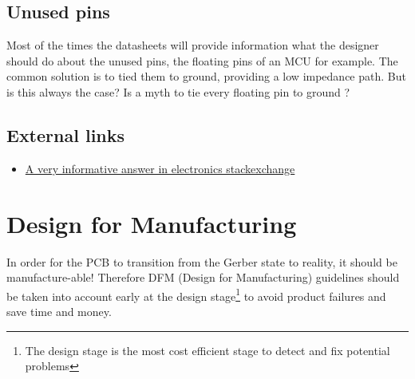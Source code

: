 \documentclass[final]{cubedoc}
\begin{document}
	\subsection{Unused pins}
	
	Most of the times the datasheets will provide information what the designer should do about the unused pins, the floating pins of an MCU for example. The common solution is to tied them to ground, providing a low impedance path. But is this always the case? Is a myth to tie every floating pin to ground \cite{learnemc:myth, rangu2014getting}?
	
	
	
	
	\subsection{External links}
	
	\begin{itemize}
		\item \href{https://web.archive.org/web/20200815071606/https://electronics.stackexchange.com/questions/15135/decoupling-caps-pcb-layout/15143}{A very informative answer in electronics stackexchange}
	\end{itemize}
	
	\section{Design for Manufacturing}
	
	In order for the PCB to transition from the Gerber state to reality, it should be manufacture-able! Therefore DFM (Design for Manufacturing) guidelines should be taken into account early at the design stage\footnote{The design stage is the most cost efficient stage to detect and fix potential problems} to avoid product failures and save time and money. 
	
\end{document}
